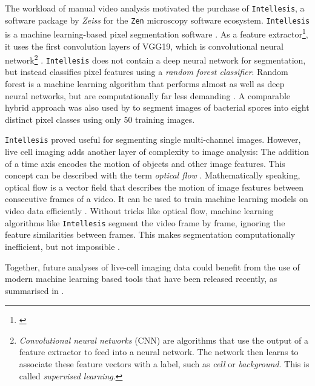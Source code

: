 \def\cnn{%
    \emph{Convolutional neural networks} (CNN) are algorithms that use the output of a
    feature extractor\footref{foot:image_features} to feed
    into a neural network. The network then learns to associate these feature
    vectors with a label, such as \emph{cell} or \emph{background}. This is called
    \emph{supervised learning}.
}

The workload of manual video analysis motivated the purchase of
\texttt{Intellesis}, a software package by \textit{Zeiss} for the \texttt{Zen}
microscopy software ecosystem. \texttt{Intellesis} is a machine learning-based
pixel segmentation software \cite{ZeissOADFeature}. As a feature
extractor\footnote{\label{foot:image_features}\imagefeatures}, it uses the
first convolution layers of VGG19, which is convolutional neural network\footnote{\cnn}
\cite{simonyanVeryDeepConvolutional2015}. \texttt{Intellesis} does not
contain a deep neural network for segmentation, but instead classifies pixel
features using a \emph{random forest classifier}. Random forest is a machine
learning algorithm that 
performs almost as well as deep neural networks, but are computationally far
less demanding \cite{breimanRandomForests2001,
    richardsonDenseNeuralNetwork2023}. A comparable hybrid approach was also used by
\citet{qamarHybridCNNRandomForest2023} to segment images of bacterial spores
into eight distinct pixel classes using only 50 training images.

\texttt{Intellesis} proved useful for segmenting single multi-channel images.
However, live cell imaging adds another layer of complexity to image analysis:
The addition of a time axis encodes the motion of objects and other image
features. This concept can be described with the term \emph{optical flow}
\cite{niehorsterOpticFlowHistory2021}. Mathematically speaking, optical flow is
a vector field that describes the motion of image
features between consecutive frames of a video. It
can be used to train machine learning models on video data efficiently
\cite{robitailleSelfsupervisedMachineLearning2022}. Without tricks like optical
flow, machine learning algorithms like \texttt{Intellesis} segment the video
frame by frame, ignoring the feature similarities between frames. This makes
segmentation computationally inefficient, but not impossible
\cite{pylvanainenLivecellImagingDeep2023}.

Together, future analyses of live-cell imaging data could  benefit
from the use of modern machine learning based tools that have been released
recently, as summarised in \citet{pylvanainenLivecellImagingDeep2023}.



